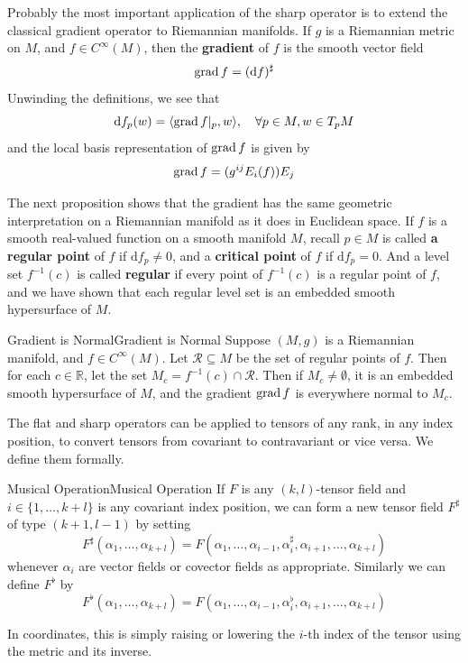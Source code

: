 \documentclass[../main.tex]{subfiles}
\begin{document}
Probably the most important application of the sharp operator is to extend the classical gradient operator to Riemannian manifolds. If $g$ is a Riemannian metric on $M$, and $f \in C^\infty(M)$, then the \textbf{gradient} of $f$ is the smooth vector field
\begin{equation}
	\operatorname{grad} f = (\mathrm{d}f)^\sharp
\end{equation}
Unwinding the definitions, we see that
\begin{equation}
	\mathrm{d} f_p(w) = \langle \operatorname{grad} f |_p, w \rangle, \quad \forall p \in M, w \in T_pM
\end{equation}
and the local basis representation of $\operatorname{grad} f$ is given by
\begin{equation}
	\operatorname{grad} f = (g^{ij} E_i(f)) E_j
\end{equation}

The next proposition shows that the gradient has the same geometric interpretation on a Riemannian manifold as it does in Euclidean space. If $f$ is a smooth real-valued function on a smooth manifold $M$, recall $p\in M$ is called \textbf{a regular point} of $f$ if $\mathrm{d}f_p \neq 0$, and a \textbf{critical point} of $f$ if $\mathrm{d}f_p = 0$. And a level set $f^{-1}(c)$ is called \textbf{regular} if every point of $f^{-1}(c)$ is a regular point of $f$, and we have shown that each regular level set is an embedded smooth hypersurface of $M$.

\begin{proposition}{Gradient is Normal}{Gradient is Normal}
	Suppose $(M, g)$ is a Riemannian manifold, and $f \in C^\infty(M)$. Let $\mathcal{R} \subseteq M$ be the set of regular points of $f$. Then for each $c \in \mathbb{R}$, let the set $M_c = f^{-1}(c) \cap \mathcal{R}$. Then if $M_c \neq \emptyset$, it is an embedded smooth hypersurface of $M$, and the gradient $\operatorname{grad} f$ is everywhere normal to $M_c$.
\end{proposition}

The flat and sharp operators can be applied to tensors of any rank, in any index position, to convert tensors from covariant to contravariant or vice versa. We define them formally.

\begin{definition}{Musical Operation}{Musical Operation}
	If $F$ is any $(k, l)$-tensor field and $i \in \{1, \ldots, k+l\}$ is any covariant index position, we can form a new tensor field $F^\sharp$ of type $(k+1, l-1)$ by setting
	\begin{equation}
		F^\sharp(\alpha_1, \ldots, \alpha_{k+l}) = F(\alpha_1, \ldots, \alpha_{i-1}, \alpha_i^\sharp, \alpha_{i+1}, \ldots, \alpha_{k+l})
	\end{equation}
	whenever $\alpha_i$ are vector fields or covector fields as appropriate. Similarly we can define $F^\flat$ by
	\begin{equation}
		F^\flat(\alpha_1, \ldots, \alpha_{k+l}) = F(\alpha_1, \ldots, \alpha_{i-1}, \alpha_i^\flat, \alpha_{i+1}, \ldots, \alpha_{k+l})
	\end{equation}
\end{definition}
In coordinates, this is simply raising or lowering the $i$-th index of the tensor using the metric and its inverse.
\end{document}
